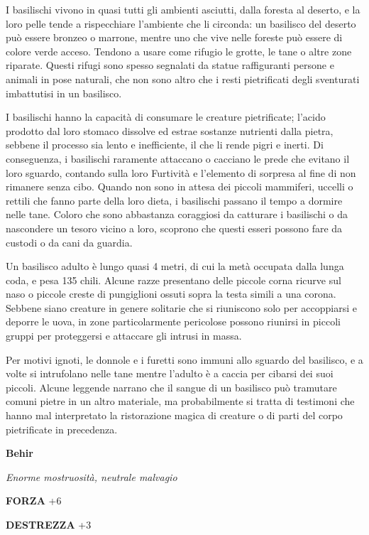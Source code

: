 \begin{multicols}{2}
I basilischi vivono in quasi tutti gli ambienti asciutti, dalla foresta al deserto, e la loro pelle tende a rispecchiare l'ambiente che li circonda: un basilisco del deserto può essere bronzeo o marrone, mentre uno che vive nelle foreste può essere di colore verde acceso. Tendono a usare come rifugio le grotte, le tane o altre zone riparate. Questi rifugi sono spesso segnalati da statue raffiguranti persone e animali in pose naturali, che non sono altro che i resti pietrificati degli sventurati imbattutisi in un basilisco.

I basilischi hanno la capacità di consumare le creature pietrificate; l'acido prodotto dal loro stomaco dissolve ed estrae sostanze nutrienti dalla pietra, sebbene il processo sia lento e inefficiente, il che li rende pigri e inerti. Di conseguenza, i basilischi raramente attaccano o cacciano le prede che evitano il loro sguardo, contando sulla loro Furtività e l'elemento di sorpresa al fine di non rimanere senza cibo. Quando non sono in attesa dei piccoli mammiferi, uccelli o rettili che fanno parte della loro dieta, i basilischi passano il tempo a dormire nelle tane. Coloro che sono abbastanza coraggiosi da catturare i basilischi o da nascondere un tesoro vicino a loro, scoprono che questi esseri possono fare da custodi o da cani da guardia.

Un basilisco adulto è lungo quasi 4 metri, di cui la metà occupata dalla lunga coda, e pesa 135 chili. Alcune razze presentano delle piccole corna ricurve sul naso o piccole creste di pungiglioni ossuti sopra la testa simili a una corona. Sebbene siano creature in genere solitarie che si riuniscono solo per accoppiarsi e deporre le uova, in zone particolarmente pericolose possono riunirsi in piccoli gruppi per proteggersi e attaccare gli intrusi in massa.

Per motivi ignoti, le donnole e i furetti sono immuni allo sguardo del basilisco, e a volte si intrufolano nelle tane mentre l'adulto è a caccia per cibarsi dei suoi piccoli. Alcune leggende narrano che il sangue di un basilisco può tramutare comuni pietre in un altro materiale, ma probabilmente si tratta di testimoni che hanno mal interpretato la ristorazione magica di creature o di parti del corpo pietrificate in precedenza.

\medskip{}\textbf{Behir}

\textit{Enorme mostruosità, neutrale malvagio}

\textbf{FORZA} +6

\textbf{DESTREZZA} +3


\end{multicols}
